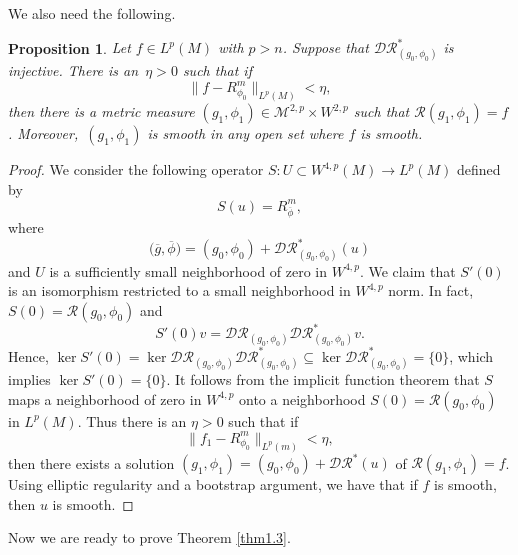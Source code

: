 \documentclass[pdftex]{sigma}
\numberwithin{equation}{section}
\newtheorem{Proposition}[Theorem]{Proposition}
 { \theoremstyle{definition}
\newtheorem{Definition}[Theorem]{Definition}
\newtheorem{Note}[Theorem]{Note}
\newtheorem{Example}[Theorem]{Example}
\newtheorem{Remark}[Theorem]{Remark} }
\begin{document}
We also need the following.

\begin{Proposition}\label{prop6.2}
 Let $f\in L^p(M)$ with $p>n$. Suppose that $\mathcal{DR}_{(g_0,\phi_0)}^*$ is injective.
 There is an~$\eta>0$ such that if
\begin{equation*}
 \|f-R_{\phi_0}^m\|_{L^p(M)}<\eta,
\end{equation*}
then there is a metric measure $(g_1,\phi_1)\in \mathcal{M}^{2,p}\times W^{2,p}$ such that $\mathcal{R}(g_1,\phi_1)=f$. Moreover,~$(g_1,\phi_1)$ is smooth in any open set where $f$ is smooth.
\end{Proposition}
\begin{proof}
 We consider the following operator $S\colon U\subset W^{4,p}(M)\to L^p(M)$ defined by
\begin{equation*}
 S(u)=R_{\overline{\phi}}^m,
\end{equation*}
where
\begin{equation*}
 \bigl(\overline{g},\overline{\phi}\bigr)=(g_0,\phi_0)+\mathcal{DR}_{(g_0,\phi_0)}^*(u)
\end{equation*}
and $U$ is a sufficiently small neighborhood of zero in $W^{4,p}$. We claim that $S'(0)$ is an isomorphism restricted to a small neighborhood in $W^{4,p}$ norm. In fact, $S(0)=\mathcal{R}(g_0,\phi_0)$ and
\begin{equation*}
 S'(0)v=\mathcal{DR}_{(g_0,\phi_0)}\mathcal{DR}^*_{(g_0,\phi_0)}v.
\end{equation*}
Hence, $\ker S'(0)=\ker \mathcal{DR}_{(g_0,\phi_0)}\mathcal{DR}^*_{(g_0,\phi_0)}\subseteq\ker \mathcal{DR}^*_{(g_0,\phi_0)}=\{0\}$,
which implies $\ker S'(0)=\{0\}$. It follows from the implicit function theorem that $S$ maps a neighborhood of zero in $W^{4,p}$ onto a neighborhood $S(0)=\mathcal{R}(g_0,\phi_0)$ in $L^p(M)$. Thus there is an $\eta>0$ such that if
\begin{equation*}
 \|f_1-R_{\phi_0}^m\|_{L^p(m)}<\eta,
\end{equation*}
then there exists a solution $(g_1,\phi_1)=(g_0,\phi_0)+\mathcal{DR}^*(u)$ of $\mathcal{R}(g_1,\phi_1)=f$. Using elliptic regularity and a bootstrap argument, we have that if $f$ is smooth, then $u$ is smooth.
\end{proof}


Now we are ready to prove Theorem \ref{thm1.3}.
\end{document}
